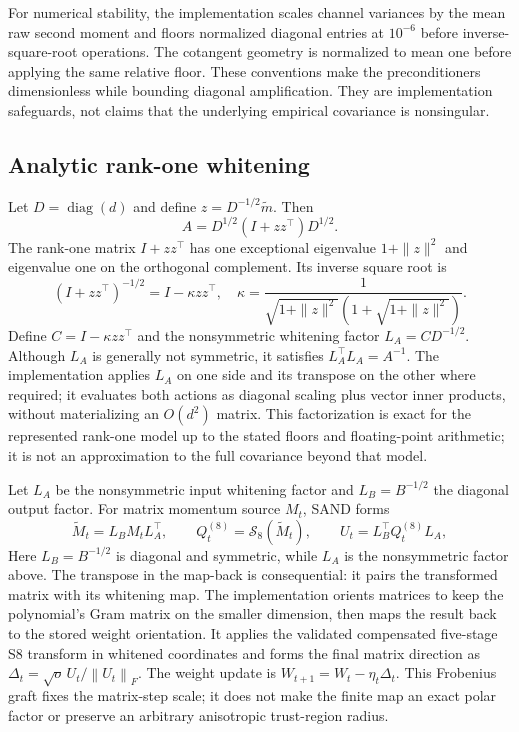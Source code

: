\documentclass[10pt]{article}
\newcommand{\FNorm}[1]{\left\lVert #1\right\rVert_F}
\begin{document}
For numerical stability, the implementation scales channel variances by the mean raw second moment and floors normalized diagonal entries at $10^{-6}$ before inverse-square-root operations. The cotangent geometry is normalized to mean one before applying the same relative floor. These conventions make the preconditioners dimensionless while bounding diagonal amplification. They are implementation safeguards, not claims that the underlying empirical covariance is nonsingular.

\subsection{Analytic rank-one whitening}
Let $D=\operatorname{diag}(d)$ and define $z=D^{-1/2}\widetilde m$. Then
\begin{equation}
 A=D^{1/2}(I+zz^\top)D^{1/2}.
\end{equation}
The rank-one matrix $I+zz^\top$ has one exceptional eigenvalue $1+\|z\|^2$ and eigenvalue one on the orthogonal complement. Its inverse square root is
\begin{equation}\label{eq:rank1}
 (I+zz^\top)^{-1/2}=I-\kappa zz^\top,\quad
 \kappa=\frac{1}{\sqrt{1+\|z\|^2}\left(1+\sqrt{1+\|z\|^2}\right)}.
\end{equation}
Define $C=I-\kappa zz^\top$ and the nonsymmetric whitening factor $L_A=CD^{-1/2}$. Although $L_A$ is generally not symmetric, it satisfies $L_A^\top L_A=A^{-1}$. The implementation applies $L_A$ on one side and its transpose on the other where required; it evaluates both actions as diagonal scaling plus vector inner products, without materializing an $O(d^2)$ matrix. This factorization is exact for the represented rank-one model up to the stated floors and floating-point arithmetic; it is not an approximation to the full covariance beyond that model.

Let $L_A$ be the nonsymmetric input whitening factor and $L_B=B^{-1/2}$ the diagonal output factor. For matrix momentum source $M_t$, SAND forms
\begin{equation}\label{eq:white}
 \widetilde M_t=L_B M_t L_A^\top,\qquad
 Q_t^{(8)}=\mathcal{S}_8(\widetilde M_t),\qquad
 U_t=L_B^\top Q_t^{(8)}L_A,
\end{equation}
Here $L_B=B^{-1/2}$ is diagonal and symmetric, while $L_A$ is the nonsymmetric factor above. The transpose in the map-back is consequential: it pairs the transformed matrix with its whitening map. The implementation orients matrices to keep the polynomial's Gram matrix on the smaller dimension, then maps the result back to the stored weight orientation. It applies the validated compensated five-stage S8 transform in whitened coordinates and forms the final matrix direction as $\Delta_t=\sqrt{o}\,U_t/\FNorm{U_t}$. The weight update is $W_{t+1}=W_t-\eta_t\Delta_t$. This Frobenius graft fixes the matrix-step scale; it does not make the finite map an exact polar factor or preserve an arbitrary anisotropic trust-region radius.
\end{document}
